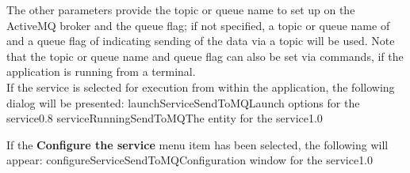 The other parameters provide the topic or queue name to set up on the ActiveMQ broker and
the queue flag; if not specified, a topic or queue name of  and a queue flag
of  \longDash{} indicating sending of the data via a topic \longDash{} will be
used.
Note that the topic or queue name and queue flag can also be set via commands, if the
application is running from a terminal.\\

\insertStandardServiceCommands
\secondaryEnd
\condPage
{}
If the service is selected for execution from within the \emph{\MMMU} application, the
following dialog will be presented:
%
{launchServiceSendToMQ}{Launch options for the \emph{\SMO} service}{0.8}
\condPage
{}%
{serviceRunningSendToMQ}{The \emph{\MMMU} entity for the \emph{\SMO} service}{1.0}

If the \textbf{Configure the service} menu item has been selected, the following will
appear:
%
{configureServiceSendToMQ}{Configuration window for the \emph{\SMO} service}{1.0}
\secondaryEnd
\primaryEnd{}
